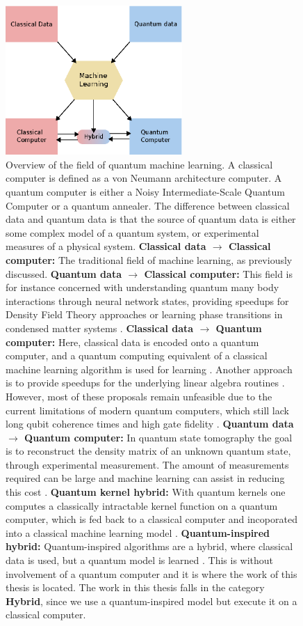 \begin{figure}[htb!]
    \centering
    \includegraphics[width=0.6\textwidth]{figures/chapter1/overlap.eps}
    \caption{Overview of the field of quantum machine learning. A classical computer is defined as a von Neumann architecture computer. A quantum computer is either a Noisy Intermediate-Scale Quantum Computer or a quantum annealer. The difference between classical data and quantum data is that the source of quantum data is either some complex model of a quantum system, or experimental measures of a physical system. \textbf{Classical data $\to$ Classical computer:} The traditional field of machine learning, as previously discussed. \textbf{Quantum data $\to$ Classical computer:} This field is for instance concerned with understanding quantum many body interactions \cite{Carleo2017, Saito2018} through neural network states, providing speedups for Density Field Theory approaches \cite{Jacobsen2018, Hegde2017} or learning phase transitions in condensed matter systems \cite{Carrasquilla2017}. \textbf{Classical data $\to$ Quantum computer:} Here, classical data is encoded onto a quantum computer, and a quantum computing equivalent of a classical machine learning algorithm is used for learning \cite{Neven2018, Schuld2019a}. Another approach is to provide speedups for the underlying linear algebra routines \cite{Lloyd2009, Lloyd2013, Lloyd2014}. However, most of these proposals remain unfeasible due to the current limitations of modern quantum computers, which still lack long qubit coherence times and high gate fidelity \cite{Preskill2018}. \textbf{Quantum data $\to$ Quantum computer:} In quantum state tomography the goal is to reconstruct the density matrix of an unknown quantum state, through experimental measurement. The amount of measurements required can be large and machine learning can assist in reducing this cost \cite{Gross2010}.
    \textbf{Quantum kernel hybrid:} With quantum kernels one computes a classically intractable kernel function on a quantum computer, which is fed back to a classical computer and incoporated into a classical machine learning model \cite{Schuld2019a}.
    \textbf{Quantum-inspired hybrid:} Quantum-inspired algorithms are a hybrid, where classical data is used, but a quantum model is learned \cite{Biamonte2017, Stoudemire2016, Xie2017, Yang2004, Amin2018}. This is without involvement of a quantum computer and it is where the work of this thesis is located. The work in this thesis falls in the category \textbf{Hybrid}, since we use a quantum-inspired model but execute it on a classical computer.
    }
    \label{fig:qml_field}
\end{figure}
\clearpage
